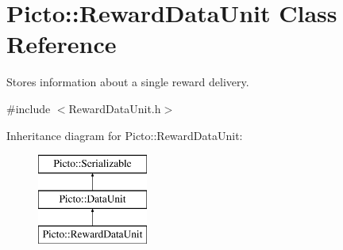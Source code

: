 \hypertarget{class_picto_1_1_reward_data_unit}{\section{Picto\-:\-:Reward\-Data\-Unit Class Reference}
\label{class_picto_1_1_reward_data_unit}
}


Stores information about a single reward delivery.  




{\ttfamily \#include $<$Reward\-Data\-Unit.\-h$>$}

Inheritance diagram for Picto\-:\-:Reward\-Data\-Unit\-:\begin{figure}[H]
\begin{center}
\leavevmode
\includegraphics[height=3.000000cm]{class_picto_1_1_reward_data_unit}
\end{center}
\end{figure}
